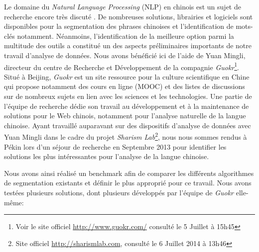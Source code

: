     Le domaine du \textit{Natural Language Processing} (NLP) en chinois est un sujet de recherche encore très discuté \citep{Qiu2013}. De nombreuses solutions, librairies et logiciels sont disponibles pour la segmentation des phrases chinoises et l'identification de mots-clés notamment. Néanmoins, l{\textquoteright}identification de la meilleure option parmi la multitude des outils a constitué un des aspects préliminaires importants de notre travail d{\textquoteright}analyse de données. Nous avons bénéficié ici de l'aide de Yuan Mingli, directeur du centre de Recherche et Développement de la compagnie \textit{Guokr}\footnote{Voir le site officiel \url{http://www.guokr.com/} consulté le 5 Juillet à 15h45}. Situé à Beijing, \textit{Guokr} est un site ressource pour la culture scientifique en Chine qui propose notamment des cours en ligne (MOOC) et des listes de discussions sur de nombreux sujets en lien avec les sciences et les technologies. Une partie de l'équipe de recherche dédie son travail au développement et à la maintenance de solutions pour le Web chinois, notamment pour l'analyse naturelle de la langue chinoise. Ayant travaillé auparavant sur des dispositifs d'analyse de données avec Yuan Mingli dans le cadre du projet \textit{Sharism Lab}\footnote{Site officiel \url{http://sharismlab.com}, consulté le 6 Juillet 2014 à 13h46}, nous nous sommes rendus à Pékin lors d'un séjour de recherche en Septembre 2013 pour identifier les solutions les plus intéressantes pour l'analyse de la langue chinoise.

    Nous avons ainsi réalisé un benchmark afin de comparer les différents algorithmes de segmentation existants et définir le plus approprié pour ce travail. Nous avons testées plusieurs solutions, dont plusieurs développés par l'équipe de \textit{Guokr} elle-même:  

